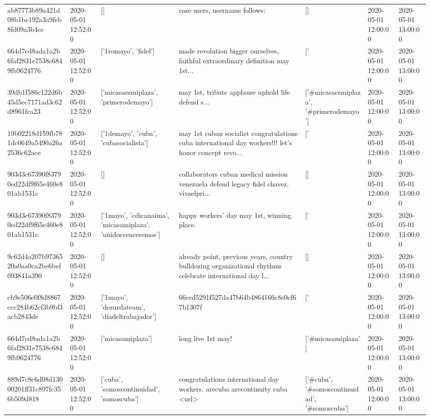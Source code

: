 \begin{tabular}{lllllll}
ab87773b89a421d08b1be192a3a9feb8fd09a3b4cc & 2020-05-01 12:52:00 & [] & case users, username follows: & [] & 2020-05-01 12:00:00 & 2020-05-01 13:00:00 \\
664d7cd8ada1a2b6faf2831e7538c6849fb9624776 & 2020-05-01 12:52:00 & ['1romayo', 'fidel'] & made revolution bigger ourselves, faithful extraordinary definition may 1st... & ['#1romayo', '#fidel'] & 2020-05-01 12:00:00 & 2020-05-01 13:00:00 \\
39db1f586c122d6b45d5ec7171ad3c62d8961fca23 & 2020-05-01 12:52:00 & ['micasaesmiplaza', 'primerodemayo'] & may 1st, tribute applause uphold life defend s... & ['#micasaesmiplaza', '#primerodemayo'] & 2020-05-01 12:00:00 & 2020-05-01 13:00:00 \\
19b02218d159fb781dc0649a5490a26a2536c62ace & 2020-05-01 12:52:00 & ['1demayo', 'cuba', 'cubasocialista'] & may 1st cuban socialist congratulations cuba international day workers!!! let's honor concept revo... & ['#1demayo', '#cuba', '#cubasocialista'] & 2020-05-01 12:00:00 & 2020-05-01 13:00:00 \\
903d3c67390f83790ed22df9f65e460e801ab1531c & 2020-05-01 12:52:00 & [] & collaborators cuban medical mission venezuela defend legacy fidel chavez. vivaelpri... & [] & 2020-05-01 12:00:00 & 2020-05-01 13:00:00 \\
903d3c67390f83790ed22df9f65e460e801ab1531c & 2020-05-01 12:52:00 & ['1mayo', 'cdicanaima', 'micasamiplaza', 'unidosvenceremos'] & happy workers' day may 1st, winning place. & ['#1mayo', '#micasamiplaza', '#unidosvenceremos'] & 2020-05-01 12:00:00 & 2020-05-01 13:00:00 \\
9c62d4a207b9736520a0aa0ca2be6bef093841a390 & 2020-05-01 12:52:00 & [] & already point, previous years, country bulldozing organizational rhythms celebrate international day l... & [] & 2020-05-01 12:00:00 & 2020-05-01 13:00:00 \\
cb9e506e0f8d8867ccc284b62cf3b9bf3acb2843de & 2020-05-01 12:52:00 & ['1mayo', 'dezurdateam', 'díadeltrabajador'] & 66ced5291f527da47b64b4864166c8e0cf67b1307f & ['#1mayo', '#dezurdateam', '#díadeltrabajador'] & 2020-05-01 12:00:00 & 2020-05-01 13:00:00 \\
664d7cd8ada1a2b6faf2831e7538c6849fb9624776 & 2020-05-01 12:52:00 & ['micasamiplaza'] & long live 1st may! & ['#micasamiplaza'] & 2020-05-01 12:00:00 & 2020-05-01 13:00:00 \\
889d7c8c6d08d13000201ff31c897fc356b509d818 & 2020-05-01 12:52:00 & ['cuba', 'somoscontinuidad', 'somoscuba'] & congratulations international day workers. arecuba arecontinuity cuba <url> & ['#cuba', '#somoscontinuidad', '#somoscuba'] & 2020-05-01 12:00:00 & 2020-05-01 13:00:00 \\

\end{tabular}
